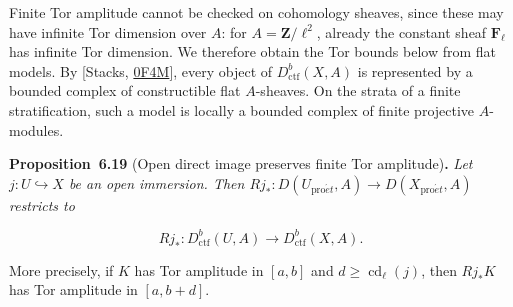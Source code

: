 \documentclass[11pt]{article}
\newenvironment{bpstatement}[2]{\par\addvspace{0.6\baselineskip}\noindent\textbf{#1}#2\textbf{.}\enspace\ignorespaces}
  {\par\addvspace{0.4\baselineskip}}
\newenvironment{bpstatementit}[2]{\begin{bpstatement}{#1}{#2}\itshape\ignorespaces}{\end{bpstatement}}
\begin{document}
Finite Tor amplitude cannot be checked on cohomology sheaves, since these may have infinite Tor dimension over \(A\): for \(A=\mathbf Z/\ell^2\), already the constant sheaf \(\mathbf F_\ell\) has infinite Tor dimension. We therefore obtain the Tor bounds below from flat models. By [Stacks, \href{https://stacks.math.columbia.edu/tag/0F4M}{0F4M}], every object of \(D^b_{\mathrm{ctf}}(X,A)\) is represented by a bounded complex of constructible flat \(A\)-sheaves. On the strata of a finite stratification, such a model is locally a bounded complex of finite projective \(A\)-modules.

\label{bp58}%
\begin{bpstatementit}{Proposition~6.19}{ (Open direct image preserves finite Tor amplitude)}
Let \(j:U\hookrightarrow X\) be an open immersion. Then \(Rj_*:D(U_{\mathrm{pro}\acute{e}t},A)\to D(X_{\mathrm{pro}\acute{e}t},A)\) restricts to

\[
Rj_*:D^b_{\mathrm{ctf}}(U,A)\longrightarrow D^b_{\mathrm{ctf}}(X,A).
\]

More precisely, if \(K\) has Tor amplitude in \([a,b]\) and \(d\ge
\operatorname{cd}_\ell(j)\), then \(Rj_*K\) has Tor amplitude in \([a,b+d]\).
\end{bpstatementit}
\end{document}
